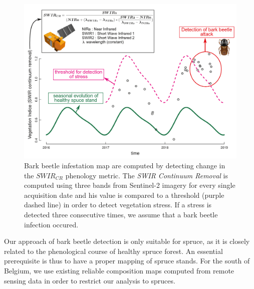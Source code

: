 \documentclass[3p,procedia]{elsarticle}
\begin{document}
\begin{figure}
	\centering
	\includegraphics[width=\textwidth]{fctHarmo.png}
	\caption{Bark beetle infestation map are computed by detecting change in the $SWIR_{CR}$ phenology metric. The \textit{SWIR Continuum Removal} is computed using three bands from Sentinel-2 imagery for every single acquisition date and his value is compared to a threshold (purple dashed line) in order to detect vegetation stress. If a stress is detected three consecutive times, we assume that a bark beetle infection occured.}
	\label{fig:harmo}
\end{figure}

Our approach of bark beetle detection is only suitable for spruce, as it is closely related to the phenological course of healthy spruce forest.
An essential prerequisite is thus to have a proper mapping of spruce stands.
For the south of Belgium, we use existing reliable composition maps \citep{bolyn_forest_2018} computed from remote sensing data in order to restrict our analysis to spruces.
\end{document}
